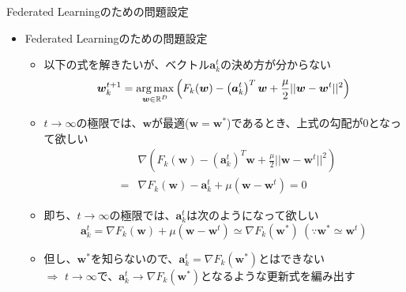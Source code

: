 \documentclass[dvipdfmx,notheorems,t]{beamer}
\begin{document}
\begin{frame}{Federated Learningのための問題設定}

\begin{itemize}
	\item Federated Learningのための問題設定
	\begin{itemize}
		\item 以下の式を解きたいが、ベクトル$\bm{a}_k^t$の決め方が分からない
		\begin{equation}
			\bm{w}_k^{t + 1} = \operatorname*{arg\,max}_{\bm{w} \in \mathbb{R}^D} \left( F_k(\bm{w}) - \left( \bm{a}_k^t \right)^T \bm{w} + \frac{\mu}{2} || \bm{w} - \bm{w}^t ||^2 \right) \nonumber
		\end{equation}
		
		\item $t \to \infty$の極限では、$\bm{w}$が最適($\bm{w} = \bm{w}^*$)であるとき、上式の勾配が$0$となって欲しい
		\begin{eqnarray}
			&& \nabla \left( F_k(\bm{w}) - \left( \bm{a}_k^t \right)^T \bm{w} + \frac{\mu}{2} || \bm{w} - \bm{w}^t ||^2 \right) \nonumber \\
			&=& \nabla F_k(\bm{w}) - \bm{a}_k^t + \mu \left( \bm{w} - \bm{w}^t \right) = 0 \nonumber
		\end{eqnarray}
		
		\item 即ち、$t \to \infty$の極限では、$\bm{a}_k^t$は次のようになって欲しい
		\begin{equation}
			\bm{a}_k^t = \nabla F_k(\bm{w}) + \mu \left( \bm{w} - \bm{w}^t \right) \simeq \nabla F_k(\bm{w}^*) \ \left( \because \bm{w}^* \simeq \bm{w}^t \right) \nonumber
		\end{equation}
		
		\item 但し、$\bm{w}^*$を知らないので、$\bm{a}_k^t = \nabla F_k(\bm{w}^*)$とはできない \\
		$\Rightarrow$ $t \to \infty$で、$\bm{a}_k^t \to \nabla F_k(\bm{w}^*)$となるような更新式を編み出す
	\end{itemize}
\end{itemize}

\end{frame}
\end{document}
